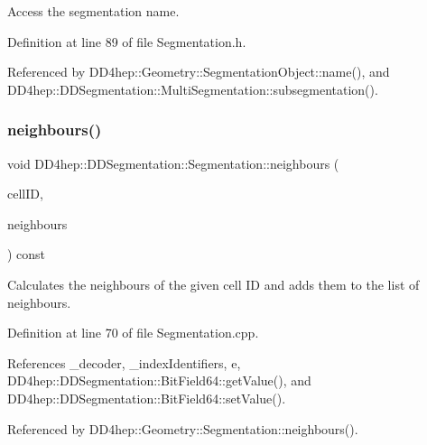 Access the segmentation name. 



Definition at line 89 of file Segmentation.\+h.



Referenced by D\+D4hep\+::\+Geometry\+::\+Segmentation\+Object\+::name(), and D\+D4hep\+::\+D\+D\+Segmentation\+::\+Multi\+Segmentation\+::subsegmentation().

\hypertarget{class_d_d4hep_1_1_d_d_segmentation_1_1_segmentation_af55e771cfd7effd0f86c4575e422891b}{}\label{class_d_d4hep_1_1_d_d_segmentation_1_1_segmentation_af55e771cfd7effd0f86c4575e422891b} 
\subsubsection{\texorpdfstring{neighbours()}{neighbours()}}
{\footnotesize\ttfamily void D\+D4hep\+::\+D\+D\+Segmentation\+::\+Segmentation\+::neighbours (\begin{DoxyParamCaption}\item[{const \hyperlink{namespace_d_d4hep_1_1_d_d_segmentation_ac7af071d85cb48820914434a07e21ba1}{Cell\+ID} \&}]{cell\+ID,  }\item[{std\+::set$<$ \hyperlink{namespace_d_d4hep_1_1_d_d_segmentation_ac7af071d85cb48820914434a07e21ba1}{Cell\+ID} $>$ \&}]{neighbours }\end{DoxyParamCaption}) const\hspace{0.3cm}{\ttfamily [virtual]}}



Calculates the neighbours of the given cell ID and adds them to the list of neighbours. 



Definition at line 70 of file Segmentation.\+cpp.



References \+\_\+decoder, \+\_\+index\+Identifiers, e, D\+D4hep\+::\+D\+D\+Segmentation\+::\+Bit\+Field64\+::get\+Value(), and D\+D4hep\+::\+D\+D\+Segmentation\+::\+Bit\+Field64\+::set\+Value().



Referenced by D\+D4hep\+::\+Geometry\+::\+Segmentation\+::neighbours().

\hypertarget{class_d_d4hep_1_1_d_d_segmentation_1_1_segmentation_a31436072c74290b541fd032efc801652}{}\label{class_d_d4hep_1_1_d_d_segmentation_1_1_segmentation_a31436072c74290b541fd032efc801652} 
